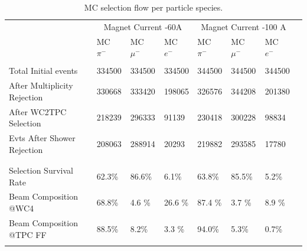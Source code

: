\begin{table}[]
\centering
\begin{tabular}{| l | l | l | l | l | l | l | l | }
\hline
 &  \multicolumn{3}{|c|}{Magnet Current -60A} & \multicolumn{3}{|c|}{Magnet Current -100 A}\\

                                                  & MC $\pi^-$   & MC  $ \mu^-$ & MC  $e^-$ & MC  $\pi^-$ & MC  $\mu^-$ & MC  $e^-$  \\
\hline
&  &  &  & & &\\  
Total Initial events                     & 334500  & 334500 & 334500 &344500 &344500& 344500 \\
After Multiplicity Rejection        & 330668  & 333420 & 198065 &326576 &344208& 201380 \\
After WC2TPC Selection          & 218239  & 296333 & 91139  &230418 &300228& 98834  \\
Evts After Shower Rejection     & 208063  & 288914 &  20293 &219882 &293585& 17780  \\
&  &  &  & & &\\  
  \hline
&  &  &  & & &\\  
Selection Survival Rate           &62.3\% & 86.6\% & 6.1\% & 63.8\%& 85.5\%& 5.2\%\\
Beam Composition  @WC4      &  68.8\%   &  4.6 \%  & 26.6 \%    & 87.4 \% & 3.7 \%  & 8.9 \% \\ %
Beam Composition  @TPC FF &  88.5\%   & 8.2\%   & 3.3 \%   & 94.0\%	& 5.3\% & 0.7\%\\
                                                  &                      &                       &                   &                       &                        &\\  
\hline
\end{tabular}
\caption{MC selection flow per particle species.}
\label{tab:MCafterCutContaminants}
\end{table}


